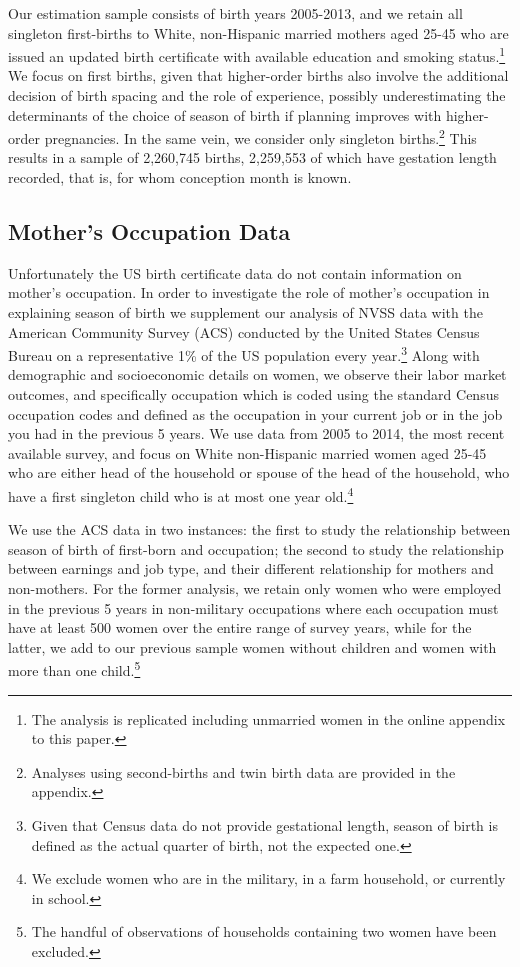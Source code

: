 \documentclass[a4paper, 12 pt]{article}
\theoremstyle{plain}
\begin{document}
\begin{doublespace}
Our estimation sample consists of birth years 2005-2013, and we retain all singleton first-births to White, non-Hispanic married mothers aged 25-45 who are issued an updated birth certificate with available education and smoking status.\footnote{The analysis is replicated including unmarried women in the online appendix to this paper.} We focus on first births, given that higher-order births also involve the additional decision of birth spacing and the role of experience, possibly underestimating the determinants of the choice of season of birth if planning improves with higher-order pregnancies. In the same vein, we consider only singleton births.\footnote{ Analyses using second-births and twin birth data are provided in the appendix.} This results in a sample of 2,260,745 births, 2,259,553 of which have gestation length recorded, that is, for whom conception month is known.


\subsection{Mother's Occupation Data}
Unfortunately the US birth certificate data do not contain information on mother's occupation. In order to investigate the role of mother's occupation in explaining season of birth we supplement our analysis of NVSS data with the American Community Survey (ACS) conducted by the United States Census Bureau on a representative 1\% of the US population every year.\footnote{ Given that Census data do not provide gestational length, season of birth is defined as the actual quarter of birth, not the expected one.} Along with demographic and socioeconomic details on women, we observe their labor market outcomes, and specifically occupation which is coded using the standard Census occupation codes and defined as the occupation in your current job or in the job you had in the previous 5 years. We use data from 2005 to 2014, the most recent available survey, and focus on White non-Hispanic married women aged 25-45 who are either head of the household or spouse of the head of the household, who have a first singleton child who is at most one year old.\footnote{We exclude women who are in the military, in a farm household, or currently in school.}

We use the ACS data in two instances: the first to study the relationship between season of birth of first-born and occupation; the second to study the relationship between earnings and job type, and their different relationship for mothers and non-mothers. For the former analysis, we retain only women who were employed in the previous 5 years in non-military occupations where each occupation must have at least 500 women over the entire range of survey years, while for the latter, we add to our previous sample women without children and women with more than one child.\footnote{ The handful of observations of households containing two women have been excluded.}



\end{doublespace}
\end{document}
